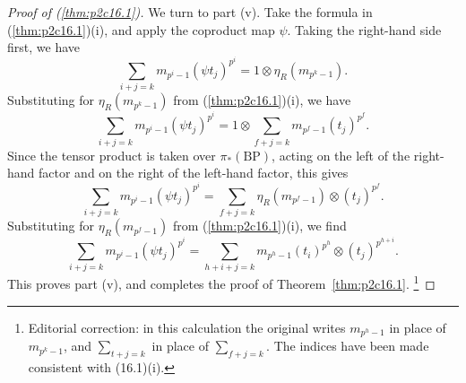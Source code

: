 \documentclass[../main]{subfiles}
\begin{document}
\begin{proof}[Proof of (\ref{thm:p2c16.1})]
We turn to part (v). Take the formula in (\ref{thm:p2c16.1})(i), and apply the coproduct map $\psi$. Taking the right-hand side first, we have \[\sum_{i + j = k} m_{p^i - 1} (\psi t_j)^{p^i} = 1 \otimes \eta_R (m_{p^k - 1}).\] Substituting for $\eta_R(m_{p^k - 1})$ from (\ref{thm:p2c16.1})(i), we have \[\sum_{i + j = k} m_{p^i - 1} (\psi t_j)^{p^i} = 1 \otimes \sum_{f + j = k} m_{p^f - 1} (t_j)^{p^f}.\] Since the tensor product is taken over $\pi_\ast(\mathrm {BP})$, acting on the left of the right-hand factor and on the right of the left-hand factor, this gives \[\sum_{i + j = k} m_{p^i - 1} (\psi t_j)^{p^i} = \sum_{f + j = k} \eta_R(m_{p^f - 1}) \otimes (t_j)^{p^f}.\] Substituting for $\eta_R(m_{p^f - 1})$ from (\ref{thm:p2c16.1})(i), we find \[\sum_{i + j = k} m_{p^i - 1} (\psi t_j)^{p^i} = \sum_{h + i + j = k} m_{p^h - 1} (t_i)^{p^h} \otimes (t_j)^{p^{h + i}}.\] This proves part (v), and completes the proof of Theorem~\ref{thm:p2c16.1}.
\footnote{Editorial correction: in this calculation the original writes $m_{p^h-1}$ in place of $m_{p^k-1}$, and $\sum_{t+j=k}$ in place of $\sum_{f+j=k}$. The indices have been made consistent with (16.1)(i).}
\end{proof}
\end{document}
